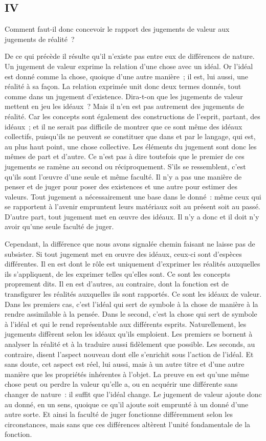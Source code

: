 \documentclass[french,twoside]{book} %
\begin{document}
\subsection[{IV}]{IV}
\noindent Comment faut-il donc concevoir le rapport des jugements de valeur aux jugements de réalité ?\par
De ce qui précède il résulte qu’il n’existe pas entre eux de différences de nature. Un jugement de valeur exprime la relation d’une chose avec un idéal. Or l’idéal est donné comme la chose, quoique d’une autre manière ; il est, lui aussi, une réalité à sa façon. La relation exprimée unit donc deux termes donnés, tout comme dans un jugement d’existence. Dira-t-on que les jugements de valeur mettent en jeu les idéaux ? Mais il n’en est pas autrement des jugements de réalité. Car les concepts sont également des constructions de l’esprit, partant, des idéaux ; et il ne serait pas difficile de montrer que ce sont même des idéaux collectifs, puisqu’ils ne peuvent se constituer que dans et par le langage, qui est, au plus haut point, une chose collective. Les éléments du jugement sont donc les mêmes de part et d’autre. Ce n’est pas à dire toutefois que le premier de ces jugements se ramène au second ou réciproquement. S’ils se ressemblent, c’est qu’ils sont l’œuvre d’une seule et même faculté. Il n’y a pas une manière de penser et de juger pour poser des existences et une autre pour estimer des valeurs. Tout jugement a nécessairement une base dans le donné : même ceux qui se rapportent à l’avenir empruntent leurs matériaux soit au présent soit au passé. D’autre part, tout jugement met en œuvre des idéaux. Il n’y a donc et il doit n’y avoir qu’une seule faculté de juger.\par
Cependant, la différence que nous avons signalée chemin faisant ne laisse pas de subsister. Si tout jugement met en œuvre des idéaux, ceux-ci sont d’espèces différentes. Il en est dont le rôle est uniquement d’exprimer les réalités auxquelles ils s’appliquent, de les exprimer telles qu’elles sont. Ce sont les concepts proprement dits. Il en est d’autres, au contraire, dont la fonction est de transfigurer les réalités auxquelles ils sont rapportés. Ce sont les idéaux de valeur. Dans les premiers cas, c’est l’idéal qui sert de symbole à la chose de manière à la rendre assimilable à la pensée. Dans le second, c’est la chose qui sert de symbole à l’idéal et qui le rend représentable aux différents esprits. Naturellement, les jugements diffèrent selon les idéaux qu’ils emploient. Les premiers se bornent à analyser la réalité et à la traduire aussi fidèlement que possible. Les seconds, au contraire, disent l’aspect nouveau dont elle s’enrichit sous l’action de l’idéal. Et sans doute, cet aspect est réel, lui aussi, mais à un autre titre et d’une autre manière que les propriétés inhérentes à l’objet. La preuve en est qu’une même chose peut ou perdre la valeur qu’elle a, ou en acquérir une différente sans changer de nature : il suffit que l’idéal change. Le jugement de valeur ajoute donc au donné, en un sens, quoique ce qu’il ajoute soit emprunté à un donné d’une autre sorte. Et ainsi la faculté de juger fonctionne différemment selon les circonstances, mais sans que ces différences altèrent l’unité fondamentale de la fonction.\par
\end{document}
